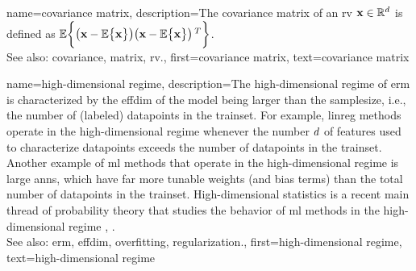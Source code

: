 {name={covariance matrix}, 
	description={The \gls{covariance} \gls{matrix} of an \gls{rv} ${\bf x} \in \mathbb{R}^{d}$ 
		is defined as $\mathbb{E} \bigg \{ \big( {\bf x} - \mathbb{E} \big\{ {\bf x} \big\} \big)  \big({\bf x} - \mathbb{E} \big\{ {\bf x} \big\} \big)\,^{T} \bigg\}$.
				\\
		See also: \gls{covariance}, \gls{matrix}, \gls{rv}.},
	first={covariance matrix},
	text={covariance matrix} 
}
	
{name={high-dimensional regime}, 
	description={The 
		high-dimensional regime of \gls{erm} is characterized by the \gls{effdim} of the \gls{model} 
		being larger than the \gls{samplesize}, i.e., the number of (labeled) \glspl{datapoint} in the \gls{trainset}. 
		For example, \gls{linreg} methods operate in the high-dimensional regime whenever the number $d$ of \glspl{feature} 
		used to characterize \glspl{datapoint} exceeds the number of \glspl{datapoint} in the \gls{trainset}. 
		Another example of \gls{ml} methods that operate in the high-dimensional regime is large \glspl{ann}, which have 
		far more tunable \gls{weights} (and bias terms) than the total number of \glspl{datapoint} in the \gls{trainset}. 
		High-dimensional statistics is a recent main thread of \gls{probability} theory that studies the 
		behavior of \gls{ml} methods in the high-dimensional regime \cite{Wain2019}, \cite{BuhlGeerBook}.
				\\
		See also: \gls{erm}, \gls{effdim}, \gls{overfitting}, \gls{regularization}.},
   	first={high-dimensional regime},
	text={high-dimensional regime} 
}

